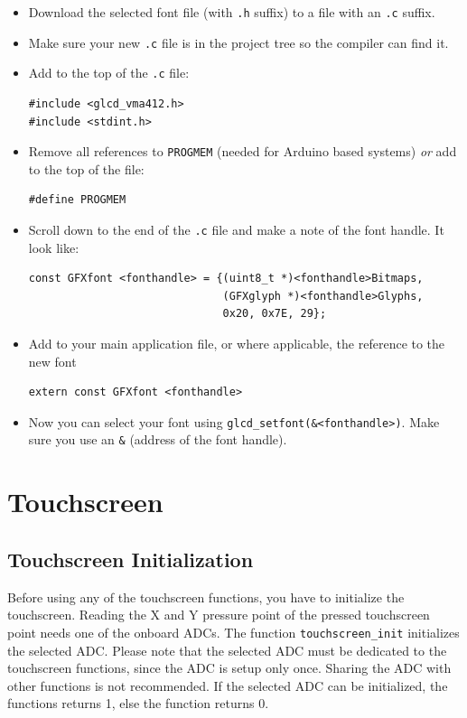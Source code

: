 \documentclass[12pt]{article}
\begin{document}
\begin{itemize}
\item Download the selected font file (with \lstinline|.h| suffix) to a file with an \lstinline|.c| suffix.
\item Make sure your new \lstinline|.c| file is in the project tree so the compiler can find it.
\item Add to the top of the \lstinline|.c| file:
\begin{lstlisting}
#include <glcd_vma412.h>
#include <stdint.h>
\end{lstlisting}
\item Remove all references to \lstinline|PROGMEM| (needed for Arduino based systems) \textsl{or} add to the top of the file:
\begin{lstlisting}
#define PROGMEM
\end{lstlisting}
\item Scroll down to the end of the \lstinline|.c| file and make a note of the font handle. It look like:
\begin{lstlisting}
const GFXfont <fonthandle> = {(uint8_t *)<fonthandle>Bitmaps,
                              (GFXglyph *)<fonthandle>Glyphs,
                              0x20, 0x7E, 29};
\end{lstlisting}
\item Add to your main application file, or where applicable, the reference to the new font
\begin{lstlisting}
extern const GFXfont <fonthandle>
\end{lstlisting}
\item Now you can select your font using \lstinline|glcd_setfont(&<fonthandle>)|. Make sure you use an \lstinline|&| (address of the font handle).
\end{itemize}


\section{Touchscreen}
\subsection{Touchscreen Initialization}
Before using any of the touchscreen functions, you have to initialize the touchscreen. Reading the X and Y pressure point of the pressed touchscreen point needs one of the onboard ADCs. The function \lstinline|touchscreen_init| initializes the selected ADC. Please note that the selected ADC must be dedicated to the touchscreen functions, since the ADC is setup only once. Sharing the ADC with other functions is not recommended. If the selected ADC can be initialized, the functions returns 1, else the function returns 0.
\end{document}

